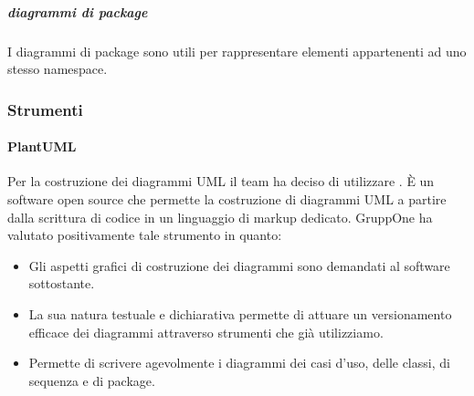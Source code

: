 \documentclass[../../norme-di-progetto.tex]{subfiles}
\begin{document}
\begin{description}

\subparagraph{diagrammi di package}%
\label{subp:diagrammi_di_package}

I diagrammi di package sono utili per rappresentare elementi appartenenti ad uno stesso namespace.

\subsubsection{Strumenti}%
\label{subs:strumenti}

\paragraph{PlantUML}%
\label{par:plantuml}
Per la costruzione dei diagrammi UML il team ha deciso di utilizzare \@.
È un software open source che permette la costruzione di diagrammi UML a partire dalla scrittura di codice in un linguaggio di markup dedicato. GruppOne ha valutato positivamente tale strumento in quanto:

\begin{itemize}
  \item Gli aspetti grafici di costruzione dei diagrammi sono demandati al software sottostante.
  \item La sua natura testuale e dichiarativa permette di attuare un versionamento efficace dei diagrammi attraverso strumenti che già utilizziamo.
  \item Permette di scrivere agevolmente i diagrammi dei casi d'uso, delle classi, di sequenza e di package.
\end{itemize}


\end{description}
\end{document}
